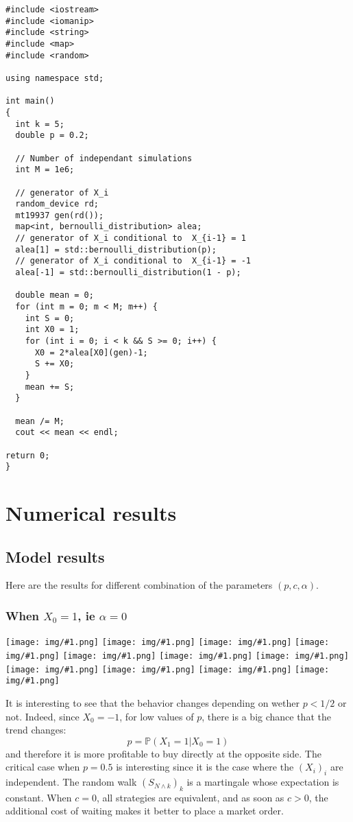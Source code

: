 \documentclass{article}
\newcommand{\Min}[2]{ {#1} \wedge {#2} }
\newcommand{\IMG}[1] { \texttt{[image: img/\#1.png]} }
\newcommand{\IMGG}[1] { \texttt{[image: img/\#1.png]} }
\begin{document}
\begin{verbatim}
#include <iostream>
#include <iomanip>
#include <string>
#include <map>
#include <random>

using namespace std;

int main()
{
  int k = 5;
  double p = 0.2;

  // Number of independant simulations
  int M = 1e6;

  // generator of X_i
  random_device rd;
  mt19937 gen(rd());
  map<int, bernoulli_distribution> alea;
  // generator of X_i conditional to  X_{i-1} = 1
  alea[1] = std::bernoulli_distribution(p);
  // generator of X_i conditional to  X_{i-1} = -1
  alea[-1] = std::bernoulli_distribution(1 - p);
  
  double mean = 0;
  for (int m = 0; m < M; m++) {
    int S = 0;
    int X0 = 1;
    for (int i = 0; i < k && S >= 0; i++) {
      X0 = 2*alea[X0](gen)-1;
      S += X0;
    }
    mean += S;
  }
  
  mean /= M;
  cout << mean << endl;
  
return 0;
}
\end{verbatim}

\newpage

\section{Numerical results}

\subsection{Model results}
Here are the results for different combination of the parameters $(p, c, \alpha)$.
\subsubsection*{When $X_0 = 1$, ie $\alpha=0$}

\begin{center}
\IMGG{legend}
\IMG{0}
\IMG{1} 
\IMG{2} 
\IMG{3} 
\IMG{4} 
\IMG{5} 
\IMG{7} 
\IMG{8} 
\IMG{9} 
\IMG{10}
\end{center}
It is interesting to see that the behavior changes depending on wether $p < 1/2$ or not. Indeed, since $X_0 = -1$, for low values of $p$, there is a big chance that the trend changes:
$$ p = \mathbb P (X_1 = 1 | X_0 = 1) $$ and therefore it is more profitable to buy directly at the opposite side.
The critical case when $p = 0.5$ is interesting since it is the case where the $(X_i)_i$ are independent. The random walk $(S_{\Min N k})_k$ is a martingale whose expectation is constant. When $c = 0$, all strategies are equivalent, and as soon as $c > 0$, the additional cost of waiting makes it better to place a market order.
\end{document}
